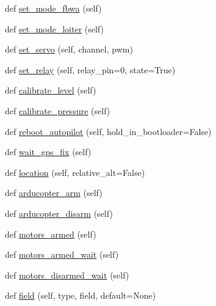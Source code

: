 \begin{DoxyCompactItemize}
\item 
def \mbox{\hyperlink{classpymavlink_1_1mavutil_1_1mavfile_a13249ac76758f732632ebefe026207f3}{set\+\_\+mode\+\_\+fbwa}} (self)
\item 
def \mbox{\hyperlink{classpymavlink_1_1mavutil_1_1mavfile_a93705650b06f0debf62ff0ddc8e1bfee}{set\+\_\+mode\+\_\+loiter}} (self)
\item 
def \mbox{\hyperlink{classpymavlink_1_1mavutil_1_1mavfile_a5dcc6c45753772530e85f70d28407c03}{set\+\_\+servo}} (self, channel, pwm)
\item 
def \mbox{\hyperlink{classpymavlink_1_1mavutil_1_1mavfile_adefc4e0924a50a82a42a49e790cfe19a}{set\+\_\+relay}} (self, relay\+\_\+pin=0, state=True)
\item 
def \mbox{\hyperlink{classpymavlink_1_1mavutil_1_1mavfile_a56b77586434e96ca161d4744104fe313}{calibrate\+\_\+level}} (self)
\item 
def \mbox{\hyperlink{classpymavlink_1_1mavutil_1_1mavfile_af0001f7ae0e3d0e63c592f3ad98740d6}{calibrate\+\_\+pressure}} (self)
\item 
def \mbox{\hyperlink{classpymavlink_1_1mavutil_1_1mavfile_ae1f8a428d88379acbdbdd0bcc0f81106}{reboot\+\_\+autopilot}} (self, hold\+\_\+in\+\_\+bootloader=False)
\item 
def \mbox{\hyperlink{classpymavlink_1_1mavutil_1_1mavfile_a270d661451b79fd6f15c2ffeb42304a6}{wait\+\_\+gps\+\_\+fix}} (self)
\item 
def \mbox{\hyperlink{classpymavlink_1_1mavutil_1_1mavfile_a15c2f7419959d23ebf1729bbd7871905}{location}} (self, relative\+\_\+alt=False)
\item 
def \mbox{\hyperlink{classpymavlink_1_1mavutil_1_1mavfile_ab9d8c0609102dc488eeb537a2d1c94fe}{arducopter\+\_\+arm}} (self)
\item 
def \mbox{\hyperlink{classpymavlink_1_1mavutil_1_1mavfile_affeb5fa286a50594954bd0e15c43718e}{arducopter\+\_\+disarm}} (self)
\item 
def \mbox{\hyperlink{classpymavlink_1_1mavutil_1_1mavfile_a335d09b6fa521448d97ea2597d0387c0}{motors\+\_\+armed}} (self)
\item 
def \mbox{\hyperlink{classpymavlink_1_1mavutil_1_1mavfile_a05ead7d3ad2e1228d222592ab34e8585}{motors\+\_\+armed\+\_\+wait}} (self)
\item 
def \mbox{\hyperlink{classpymavlink_1_1mavutil_1_1mavfile_aff2ed2950af9ff7a504b1a304288d019}{motors\+\_\+disarmed\+\_\+wait}} (self)
\item 
def \mbox{\hyperlink{classpymavlink_1_1mavutil_1_1mavfile_ae2070e90f4df43fc8b44ae29a9a996ed}{field}} (self, type, field, default=None)

\end{DoxyCompactItemize}
